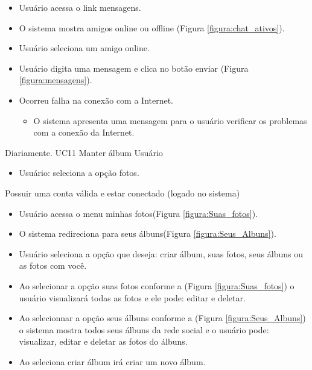 {}
{
\begin{itemize}
	\item Usuário acessa o link mensagens.
	\item O sistema mostra amigos online ou offline (Figura \ref{figura:chat_ativos}).
	\item Usuário seleciona um amigo online.
	\item Usuário digita uma mensagem e clica no botão enviar (Figura \ref{figura:mensagens}).
\end{itemize}
}
{
\begin{itemize}
	\item Ocorreu falha na conexão com a Internet.
	\begin{itemize}
	\item O sistema apresenta uma mensagem para o usuário verificar os problemas com a conexão da Internet.
	\end{itemize}
\end{itemize}
}
{Diariamente.}
{
}
\casoDeUso
{UC11}
{Manter álbum}
{Usuário}
{
\begin{itemize}
	\item Usuário: seleciona a opção fotos.
	
\end{itemize}

}
 {Possuir uma conta válida e estar conectado (logado no sistema)}
{}
{
\begin{itemize}
	\item Usuário acessa o menu minhas fotos(Figura \ref{figura:Suas_fotos}).
	\item O sistema redireciona para seus álbuns(Figura \ref{figura:Seus_Albuns}).
	\item Usuário seleciona a opção que deseja: criar álbum, suas fotos, seus álbuns ou as fotos com você.
	
\end{itemize}
}
{
\begin{itemize}
	\item Ao selecionar a opção suas fotos conforme a (Figura \ref{figura:Suas_fotos}) o usuário visualizará todas as fotos e ele pode: editar e deletar.
	\item Ao selecionnar a opção seus álbuns conforme a (Figura \ref{figura:Seus_Albuns}) o sistema mostra todos seus álbuns da rede social e o usuário pode: visualizar, editar e deletar as fotos do álbuns.
	\item Ao seleciona criar álbum irá criar um novo álbum.
	
\end{itemize}
}
